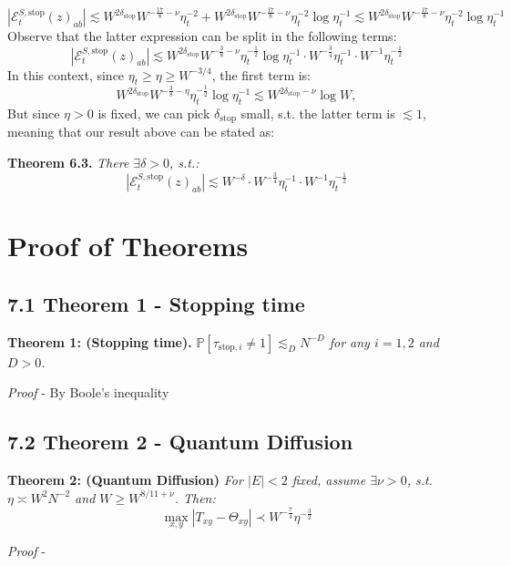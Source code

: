 \documentclass[11pt]{article}
\newenvironment{boxtheorem}[1]
  {\begin{mdframed}\noindent\textbf{#1}\itshape\space}
  {\end{mdframed}}
\newcommand{\E}{\mathcal{E}}
\newcommand{\sto}{\text{stop}}
\begin{document}
\begin{equation*}
|\E_t^{S, \sto}(z)_{ab}|\lesssim W^{2\delta_\sto} W^{-\frac{17}{8}-\nu} \eta_t^{-2}+W^{2\delta_\sto}W^{-\frac{17}{8}-\nu}\eta_t^{-2}\log \eta_t^{-1} \lesssim W^{2\delta_\sto}W^{-\frac{17}{8}-\nu}\eta_t^{-2}\log \eta_t^{-1}
\end{equation*}
Observe that the latter expression can be split in the following terms: $$|\E_t^{S, \sto}(z)_{ab}|\lesssim W^{2\delta_\sto} W^{-\frac{3}{8}-\nu} \eta_t^{-\frac{1}{2}}\log \eta_t^{-1}\cdot W^{-\frac{3}{4}}\eta_t^{-1}\cdot W^{-1}\eta_t^{-\frac{1}{2}}$$
In this context, since $\eta_t \geq \eta\geq W^{-3/4}$, the first term is: $$W^{2\delta_\sto} W^{-\frac{3}{8}-\eta}\eta_t^{-\frac{1}{2}}\log \eta_t^{-1}\lesssim W^{2\delta_\sto-\nu}\log W,$$
But since $\eta>0$ is fixed, we can pick $\delta_\sto$ small, s.t. the latter term is $\lesssim 1$, meaning that our result above can be stated as: 
\begin{boxtheorem}{Theorem 6.3. }There $\exists \delta>0$, s.t.:
$$|\E_t^{S, \sto}(z)_{ab}|\lesssim W^{-\delta}\cdot W^{-\frac{3}{4}}\eta_t^{-1}\cdot W^{-1}\eta_t^{-\frac{1}{2}}$$
\end{boxtheorem}

\newpage

\section{Proof of Theorems}

\subsection*{7.1 Theorem 1 - Stopping time}
\label{proof-stop}

\begin{boxtheorem}{Theorem 1: (Stopping time).} $\mathbb{P}[\tau_{\text{stop}, i} \neq  1] \lesssim_D N^{-D}$ for any $i=1, 2$ and $D > 0$.
\end{boxtheorem}
\textit{Proof} - By Boole's inequality

\subsection*{7.2 Theorem 2 - Quantum Diffusion}
\begin{boxtheorem}{Theorem 2: (Quantum Diffusion)}
For $|E|<2$ fixed, assume $\exists \nu>0$, s.t. $\eta \asymp W^2 N^{-2}$ and $W\geq W^{8/11+\nu}$. Then: $$\max_{x, y}|T_{xy}-\Theta_{xy}|\prec W^{-\frac{7}{4}}\eta^{-\frac{3}{2}}$$
\end{boxtheorem}
\textit{Proof} - 
\end{document}
